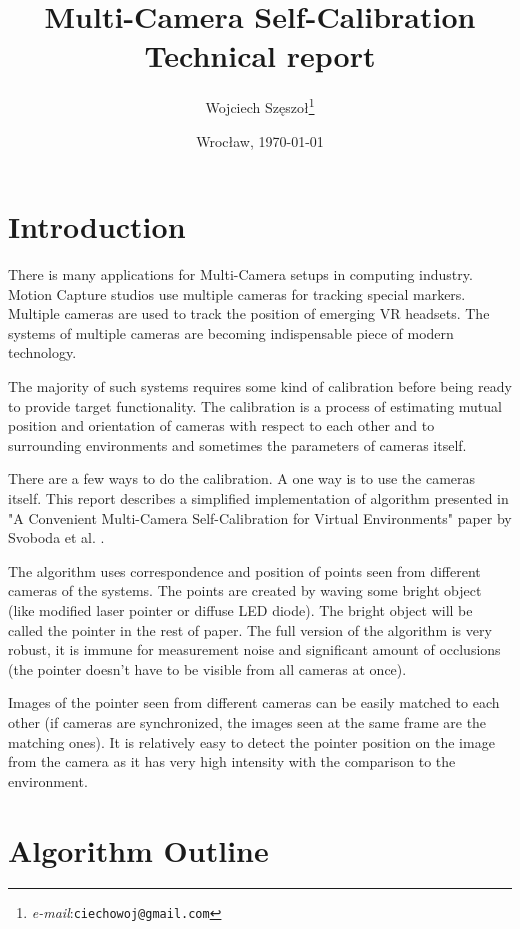 \documentclass[12pt]{article}
\title{\textbf{Multi-Camera Self-Calibration}\\{\large Technical report}}
\author{Wojciech Szęszoł\thanks{\textit{e-mail}:\texttt{ciechowoj@gmail.com}}}
\date{Wrocław, \today}
\begin{document}
\maketitle


\thispagestyle{empty}
\newpage

\section{Introduction}
There is many applications for Multi-Camera setups in computing industry. Motion Capture studios use multiple cameras for tracking special markers. Multiple cameras are used to track the position of emerging VR headsets. The systems of multiple cameras are becoming indispensable piece of modern technology.

The majority of such systems requires some kind of calibration before being ready to provide target functionality. The calibration is a process of estimating mutual position and orientation of cameras with respect to each other and to surrounding environments and sometimes the parameters of cameras itself.

There are a few ways to do the calibration. A one way is to use the cameras itself. This report describes a simplified implementation of algorithm presented in "A Convenient Multi-Camera Self-Calibration for Virtual Environments" paper by Svoboda et al. \cite{svoboda05}.

The algorithm uses correspondence and position of points seen from different cameras of the systems. The points are created by waving some bright object (like modified laser pointer or diffuse LED diode). The bright object will be called the pointer in the rest of paper. The full version of the algorithm is very robust, it is immune for measurement noise and significant amount of occlusions (the pointer doesn't have to be visible from all cameras at once).

Images of the pointer seen from different cameras can be easily matched to each other (if cameras are synchronized, the images seen at the same frame are the matching ones). It is relatively easy to detect the pointer position on the image from the camera as it has very high intensity with  the comparison to the environment.

\section{Algorithm Outline}
\end{document}
